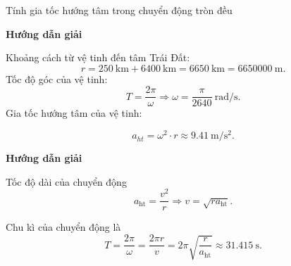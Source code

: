 \begin{dang}{Tính gia tốc hướng tâm trong chuyển động tròn đều}
	
	{	\begin{center}
			\textbf{Hướng dẫn giải}
		\end{center}
		
		Khoảng cách từ vệ tinh đến tâm Trái Đất: 
		$$r=250\ \text{km}+6400\ \text{km} =6650\ \text{km}=6650000\ \text{m}. $$
		Tốc độ góc của vệ tinh:
		$$T=\frac{2\pi}{\omega} \Rightarrow \omega = \frac{\pi}{2640}\ \text{rad/s}.$$ 
		Gia tốc hướng tâm của vệ tinh: 
		
		$$a_{ht}=\omega^2 \cdot r \approx \SI{9,41}{ \meter/\second^2}.$$ 
		
	}
	
	{	\begin{center}
			\textbf{Hướng dẫn giải}
		\end{center}
		
		Tốc độ dài của chuyển động
		$$a_\text{ht} =\dfrac{v^2}{r} \Rightarrow v =\sqrt {ra_\text{ht}}.$$
		
		Chu kì của chuyển động là
		$$T =\dfrac{2\pi}{\omega} = \dfrac{2\pi r}{v} = 2\pi \sqrt{\dfrac{r}{a_\text{ht}}} \approx \SI{31.415}{\second}.$$
		
	}
\end{dang}